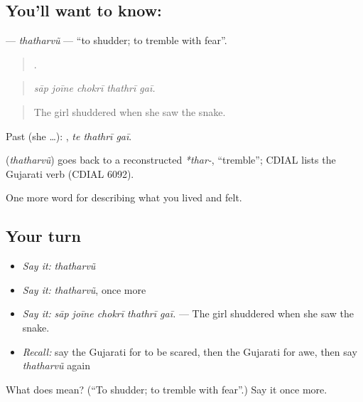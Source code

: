 \subsection*{You'll want to know: }
\textbf{} — \emph{thatharvũ} — \textquotedblleft{}to shudder; to tremble with fear\textquotedblright{}.

\begin{quote}
    .
\end{quote}

\begin{quote}
\emph{sāp joīne chokrī thathrī gaī.}
\end{quote}

\begin{quote}
The girl shuddered when she saw the snake.
\end{quote}

Past (she …):   , \emph{te thathrī gaī}.

\begin{cousinweb}
\textbf{} (\emph{thatharvũ}) goes back to a reconstructed \emph{*thar-}, \textquotedblleft{}tremble\textquotedblright{}; CDIAL lists the Gujarati verb (CDIAL 6092).
\end{cousinweb}

\begin{grammarlens}[title={What you've built}]
One more word for describing what you lived and felt.
\end{grammarlens}

\subsection*{Your turn}
\begin{itemize}
\raggedright
  \item \emph{Say it:} \emph{thatharvũ}
  \item \emph{Say it:} \emph{thatharvũ}, once more
  \item \emph{Say it:} \emph{sāp joīne chokrī thathrī gaī.} — The girl shuddered when she saw the snake.
  \item \emph{Recall:} say the Gujarati for to be scared, then the Gujarati for awe, then say \emph{thatharvũ} again
\end{itemize}

\begin{tcolorbox}[breakable,colback=teal!4,colframe=teal!35!black,title={Before you move on}]
What does  mean? (\textquotedblleft{}To shudder; to tremble with fear\textquotedblright{}.) Say it once more.
\end{tcolorbox}
